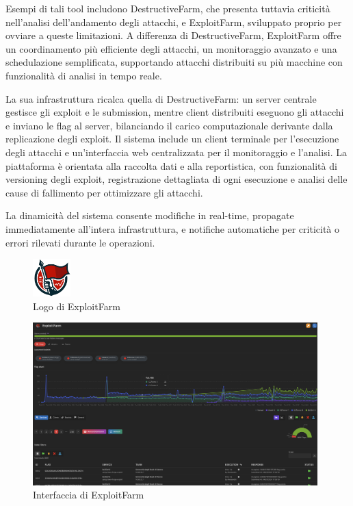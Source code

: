 Esempi di tali tool includono DestructiveFarm, che presenta tuttavia criticità nell'analisi dell'andamento degli attacchi, e ExploitFarm, sviluppato proprio per ovviare a queste limitazioni. A differenza di DestructiveFarm, ExploitFarm offre un coordinamento più efficiente degli attacchi, un monitoraggio avanzato e una schedulazione semplificata, supportando attacchi distribuiti su più macchine con funzionalità di analisi in tempo reale.

La sua infrastruttura ricalca quella di DestructiveFarm: un server centrale gestisce gli exploit e le submission, mentre client distribuiti eseguono gli attacchi e inviano le flag al server, bilanciando il carico computazionale derivante dalla replicazione degli exploit. Il sistema include un client terminale per l'esecuzione degli attacchi e un'interfaccia web centralizzata per il monitoraggio e l'analisi. La piattaforma è orientata alla raccolta dati e alla reportistica, con funzionalità di versioning degli exploit, registrazione dettagliata di ogni esecuzione e analisi delle cause di fallimento per ottimizzare gli attacchi.

La dinamicità del sistema consente modifiche in real-time, propagate immediatamente all'intera infrastruttura, e notifiche automatiche per criticità o errori rilevati durante le operazioni.

\begin{figure}[H]
    \centering
    \includegraphics[width=0.13\textwidth]{images/chapter1/ExploitFarmLogo.png}
    \caption{Logo di ExploitFarm}\label{fig:exploitfarm}
\end{figure}

\begin{figure}[H]
    \centering
    \includegraphics[width=0.98\textwidth]{images/chapter1/exploitfarm_interface.png}
    \caption{Interfaccia di ExploitFarm}\label{fig:exploitfarm_interface}
\end{figure}

